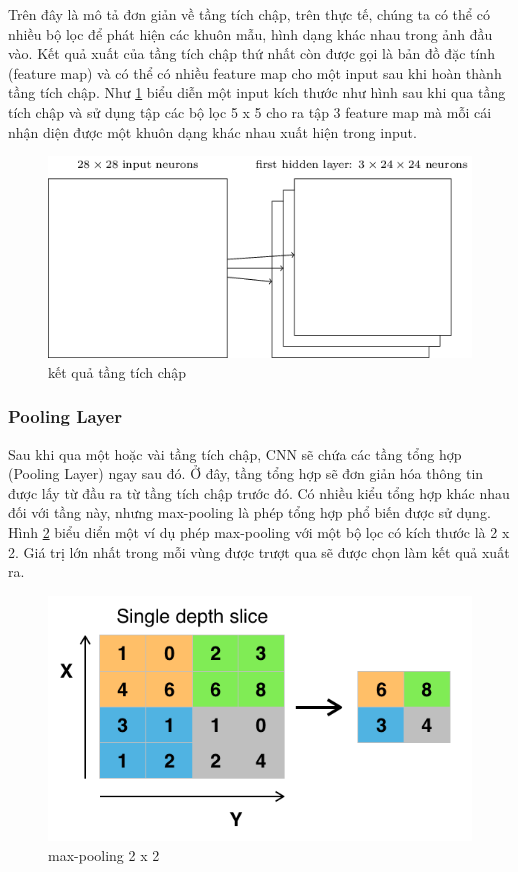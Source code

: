 		Trên đây là mô tả đơn giản về tầng tích chập, trên thực tế, chúng ta có thể có nhiều bộ lọc để phát hiện các khuôn mẫu, hình dạng khác nhau trong ảnh đầu vào. Kết quả xuất của tầng tích chập thứ nhất còn được gọi là bản đồ đặc tính (feature map) và có thể có nhiều feature map cho một input sau khi hoàn thành tầng tích chập. Như \ref{fig:feature_map} biểu diễn một input kích thước như hình sau khi qua tầng tích chập và sử dụng tập các bộ lọc 5 x 5 cho ra tập 3 feature map mà mỗi cái nhận diện được một khuôn dạng khác nhau xuất hiện trong input.
		\begin{figure}[h!]
			\centering
			\includegraphics[scale=0.5]{charts/feature_map.png}
			\caption{kết quả tầng tích chập}
			\label{fig:feature_map}
		\end{figure}
	
	\subsubsection{Pooling Layer}		
		Sau khi qua một hoặc vài tầng tích chập, CNN sẽ chứa các tầng tổng hợp (Pooling Layer) ngay sau đó. Ở đây, tầng tổng hợp sẽ đơn giản hóa thông tin được lấy từ đầu ra từ tầng tích chập trước đó. Có nhiều kiểu tổng hợp khác nhau đối với tầng này, nhưng max-pooling là phép tổng hợp phổ biến được sử dụng. Hình \ref{fig:max-pooling} biểu diển một ví dụ phép max-pooling với một bộ lọc có kích thước là 2 x 2. Giá trị lớn nhất trong mỗi vùng được trượt qua sẽ được chọn làm kết quả xuất ra.
		
		\begin{figure}[h!]
			\centering
			\includegraphics[scale=0.7]{charts/max_pooling.png}
			\caption{max-pooling 2 x 2}
			\label{fig:max-pooling}
		\end{figure}
		\pagebreak
		
